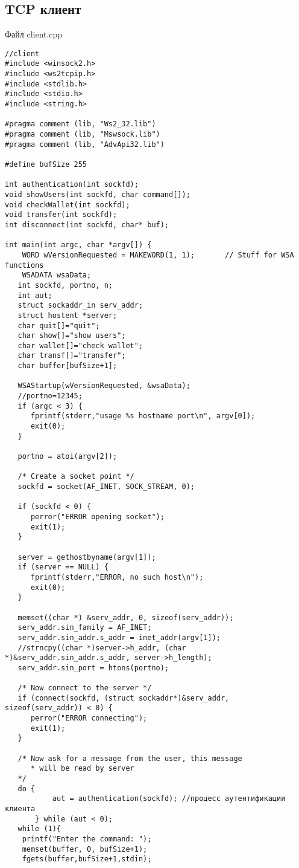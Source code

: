 \documentclass[12pt,a4paper]{report}
\begin{document}
\subsection*{TCP клиент}
Файл client.cpp
\begin{lstlisting}
//client
#include <winsock2.h>
#include <ws2tcpip.h>
#include <stdlib.h>
#include <stdio.h>
#include <string.h>

#pragma comment (lib, "Ws2_32.lib")
#pragma comment (lib, "Mswsock.lib")
#pragma comment (lib, "AdvApi32.lib")

#define bufSize 255

int authentication(int sockfd);
void showUsers(int sockfd, char command[]);
void checkWallet(int sockfd);
void transfer(int sockfd);
int disconnect(int sockfd, char* buf);

int main(int argc, char *argv[]) {
	WORD wVersionRequested = MAKEWORD(1, 1);       // Stuff for WSA functions
	WSADATA wsaData;
   int sockfd, portno, n;
   int aut;
   struct sockaddr_in serv_addr;
   struct hostent *server;
   char quit[]="quit";
   char show[]="show users";
   char wallet[]="check wallet";
   char transf[]="transfer";
   char buffer[bufSize+1];

   WSAStartup(wVersionRequested, &wsaData);
   //portno=12345;
   if (argc < 3) {
      fprintf(stderr,"usage %s hostname port\n", argv[0]);
      exit(0);
   }

   portno = atoi(argv[2]);

   /* Create a socket point */
   sockfd = socket(AF_INET, SOCK_STREAM, 0);

   if (sockfd < 0) {
      perror("ERROR opening socket");
      exit(1);
   }

   server = gethostbyname(argv[1]);
   if (server == NULL) {
      fprintf(stderr,"ERROR, no such host\n");
      exit(0);
   }

   memset((char *) &serv_addr, 0, sizeof(serv_addr));
   serv_addr.sin_family = AF_INET;
   serv_addr.sin_addr.s_addr = inet_addr(argv[1]);
   //strncpy((char *)server->h_addr, (char *)&serv_addr.sin_addr.s_addr, server->h_length);
   serv_addr.sin_port = htons(portno);

   /* Now connect to the server */
   if (connect(sockfd, (struct sockaddr*)&serv_addr, sizeof(serv_addr)) < 0) {
      perror("ERROR connecting");
      exit(1);
   }

   /* Now ask for a message from the user, this message
      * will be read by server
   */
   do {
           aut = authentication(sockfd); //процесс аутентификации клиента
       } while (aut < 0);
   while (1){
    printf("Enter the command: ");
    memset(buffer, 0, bufSize+1);
    fgets(buffer,bufSize+1,stdin);


\end{lstlisting}
\end{document}
